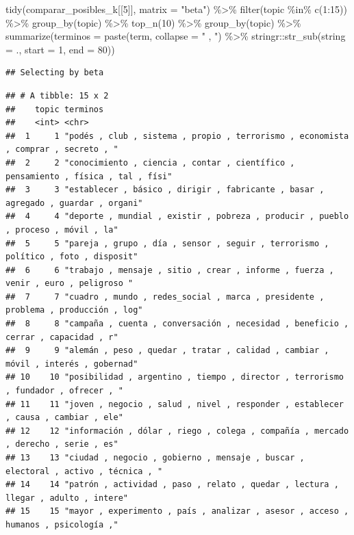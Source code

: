 \documentclass[
]{book}
\newenvironment{Shaded}{\begin{snugshade}}{\end{snugshade}}
\newcommand{\AttributeTok}[1]{\textcolor[rgb]{0.77,0.63,0.00}{#1}}
\newcommand{\DecValTok}[1]{\textcolor[rgb]{0.00,0.00,0.81}{#1}}
\newcommand{\FunctionTok}[1]{\textcolor[rgb]{0.00,0.00,0.00}{#1}}
\newcommand{\NormalTok}[1]{#1}
\newcommand{\SpecialCharTok}[1]{\textcolor[rgb]{0.00,0.00,0.00}{#1}}
\newcommand{\StringTok}[1]{\textcolor[rgb]{0.31,0.60,0.02}{#1}}
\begin{document}
\begin{Shaded}
\begin{Highlighting}[]
\FunctionTok{tidy}\NormalTok{(comparar\_posibles\_k[[}\DecValTok{5}\NormalTok{]], }\AttributeTok{matrix =} \StringTok{"beta"}\NormalTok{) }\SpecialCharTok{\%\textgreater{}\%}
  \FunctionTok{filter}\NormalTok{(topic }\SpecialCharTok{\%in\%} \FunctionTok{c}\NormalTok{(}\DecValTok{1}\SpecialCharTok{:}\DecValTok{15}\NormalTok{)) }\SpecialCharTok{\%\textgreater{}\%}
  \FunctionTok{group\_by}\NormalTok{(topic) }\SpecialCharTok{\%\textgreater{}\%}
  \FunctionTok{top\_n}\NormalTok{(}\DecValTok{10}\NormalTok{) }\SpecialCharTok{\%\textgreater{}\%}
  \FunctionTok{group\_by}\NormalTok{(topic) }\SpecialCharTok{\%\textgreater{}\%}
  \FunctionTok{summarize}\NormalTok{(}\AttributeTok{terminos =} \FunctionTok{paste}\NormalTok{(term, }\AttributeTok{collapse =} \StringTok{" , "}\NormalTok{) }\SpecialCharTok{\%\textgreater{}\%}\NormalTok{ stringr}\SpecialCharTok{::}\FunctionTok{str\_sub}\NormalTok{(}\AttributeTok{string =}\NormalTok{ ., }\AttributeTok{start =} \DecValTok{1}\NormalTok{, }\AttributeTok{end =} \DecValTok{80}\NormalTok{)) }
\end{Highlighting}
\end{Shaded}

\begin{verbatim}
## Selecting by beta
\end{verbatim}

\begin{verbatim}
## # A tibble: 15 x 2
##    topic terminos                                                                          
##    <int> <chr>                                                                             
##  1     1 "podés , club , sistema , propio , terrorismo , economista , comprar , secreto , "
##  2     2 "conocimiento , ciencia , contar , científico , pensamiento , física , tal , físi"
##  3     3 "establecer , básico , dirigir , fabricante , basar , agregado , guardar , organi"
##  4     4 "deporte , mundial , existir , pobreza , producir , pueblo , proceso , móvil , la"
##  5     5 "pareja , grupo , día , sensor , seguir , terrorismo , político , foto , disposit"
##  6     6 "trabajo , mensaje , sitio , crear , informe , fuerza , venir , euro , peligroso "
##  7     7 "cuadro , mundo , redes_social , marca , presidente , problema , producción , log"
##  8     8 "campaña , cuenta , conversación , necesidad , beneficio , cerrar , capacidad , r"
##  9     9 "alemán , peso , quedar , tratar , calidad , cambiar , móvil , interés , gobernad"
## 10    10 "posibilidad , argentino , tiempo , director , terrorismo , fundador , ofrecer , "
## 11    11 "joven , negocio , salud , nivel , responder , establecer , causa , cambiar , ele"
## 12    12 "información , dólar , riego , colega , compañía , mercado , derecho , serie , es"
## 13    13 "ciudad , negocio , gobierno , mensaje , buscar , electoral , activo , técnica , "
## 14    14 "patrón , actividad , paso , relato , quedar , lectura , llegar , adulto , intere"
## 15    15 "mayor , experimento , país , analizar , asesor , acceso , humanos , psicología ,"
\end{verbatim}
\end{document}
